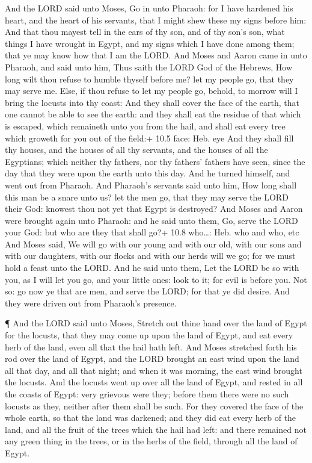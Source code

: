  And the LORD said unto Moses, Go in unto Pharaoh: for I
have hardened his heart, and the heart of his servants, that I might
shew these my signs before him:  And that thou mayest tell
in the ears of thy son, and of thy son's son, what things I have wrought
in Egypt, and my signs which I have done among them; that ye may know
how that I am the LORD.  And Moses and Aaron came in unto
Pharaoh, and said unto him, Thus saith the LORD God of the Hebrews, How
long wilt thou refuse to humble thyself before me? let my people go,
that they may serve me.  Else, if thou refuse to let my
people go, behold, to morrow will I bring the locusts into thy coast:
 And they shall cover the face of the earth, that one cannot
be able to see the earth: and they shall eat the residue of that which
is escaped, which remaineth unto you from the hail, and shall eat every
tree which groweth for you out of the field:+ 10.5 face: Heb. eye
 And they shall fill thy houses, and the houses of all thy
servants, and the houses of all the Egyptians; which neither thy
fathers, nor thy fathers' fathers have seen, since the day that they
were upon the earth unto this day. And he turned himself, and went out
from Pharaoh.  And Pharaoh's servants said unto him, How
long shall this man be a snare unto us? let the men go, that they may
serve the LORD their God: knowest thou not yet that Egypt is destroyed?
 And Moses and Aaron were brought again unto Pharaoh: and he
said unto them, Go, serve the LORD your God: but who are they that shall
go?+ 10.8 who\ldots: Heb. who and who, etc  And Moses said,
We will go with our young and with our old, with our sons and with our
daughters, with our flocks and with our herds will we go; for we must
hold a feast unto the LORD.  And he said unto them, Let the
LORD be so with you, as I will let you go, and your little ones: look to
it; for evil is before you.  Not so: go now ye that are
men, and serve the LORD; for that ye did desire. And they were driven
out from Pharaoh's presence.

 ¶ And the LORD said unto Moses, Stretch out thine hand
over the land of Egypt for the locusts, that they may come up upon the
land of Egypt, and eat every herb of the land, even all that the hail
hath left.  And Moses stretched forth his rod over the land
of Egypt, and the LORD brought an east wind upon the land all that day,
and all that night; and when it was morning, the east wind brought the
locusts.  And the locusts went up over all the land of
Egypt, and rested in all the coasts of Egypt: very grievous were they;
before them there were no such locusts as they, neither after them shall
be such.  For they covered the face of the whole earth, so
that the land was darkened; and they did eat every herb of the land, and
all the fruit of the trees which the hail had left: and there remained
not any green thing in the trees, or in the herbs of the field, through
all the land of Egypt.

